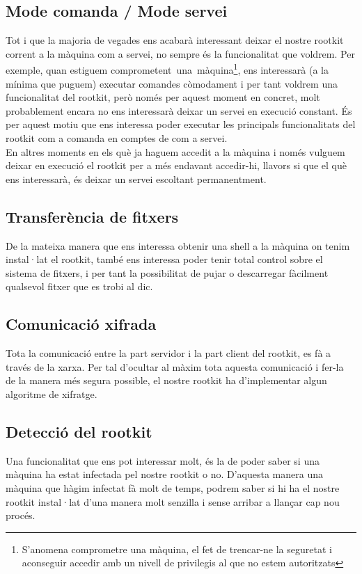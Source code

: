 \subsection{Mode comanda / Mode servei}
Tot i que la majoria de vegades ens acabarà interessant deixar el nostre rootkit corrent a la màquina com a servei, no sempre
és la funcionalitat que voldrem. Per exemple, quan estiguem \mbox{comprometent una màquina}\footnote{S'anomena comprometre una màquina,
el fet de trencar-ne la seguretat i aconseguir accedir amb un nivell de privilegis al que no estem autoritzats}, ens interessarà
(a la mínima que puguem) executar comandes còmodament i per tant voldrem una funcionalitat del rootkit, però només per aquest moment en
concret, molt probablement encara no ens interessarà deixar un servei en execució constant. És per aquest motiu que ens interessa poder
executar les principals funcionalitats del rootkit com a comanda en comptes de com a servei.  \\

En altres moments en els què ja haguem accedit a la màquina i només vulguem deixar en
execució el rootkit per a més endavant accedir-hi, llavors si que el què ens interessarà, és deixar un servei escoltant permanentment.

\subsection{Transferència de fitxers}
De la mateixa manera que ens interessa obtenir una shell a la màquina on tenim instal·lat el rootkit, també ens interessa
poder tenir total control sobre el sistema de fitxers, i per tant la possibilitat de pujar o descarregar fàcilment 
qualsevol fitxer que es trobi al dic.

\subsection{Comunicació xifrada}
Tota la comunicació entre la part servidor i la part client del rootkit, es fà a través de la xarxa. Per tal d'ocultar al màxim 
tota aquesta comunicació i fer-la de la manera més segura possible, el nostre rootkit ha d'implementar algun algoritme de xifratge.

\subsection{Detecció del rootkit}
Una funcionalitat que ens pot interessar molt, és la de poder saber si una màquina ha estat infectada pel nostre rootkit o no. 
D'aquesta manera una màquina que hàgim infectat fà molt de temps, podrem saber si hi ha el nostre rootkit instal·lat d'una manera molt 
senzilla i sense arribar a llançar cap nou procés.

